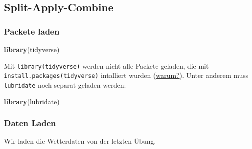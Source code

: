 \documentclass[]{book}
\newenvironment{Shaded}{\begin{snugshade}}{\end{snugshade}}
\newcommand{\DataTypeTok}[1]{\textcolor[rgb]{0.13,0.29,0.53}{#1}}
\newcommand{\KeywordTok}[1]{\textcolor[rgb]{0.13,0.29,0.53}{\textbf{#1}}}
\newcommand{\NormalTok}[1]{#1}
\newcommand{\OtherTok}[1]{\textcolor[rgb]{0.56,0.35,0.01}{#1}}
\newcommand{\StringTok}[1]{\textcolor[rgb]{0.31,0.60,0.02}{#1}}
\begin{document}
\hypertarget{split-apply-combine}{%
\subsection{Split-Apply-Combine}\label{split-apply-combine}}

\hypertarget{packete-laden}{%
\subsubsection{Packete laden}\label{packete-laden}}

\begin{Shaded}
\begin{Highlighting}[]
\KeywordTok{library}\NormalTok{(tidyverse)}
\end{Highlighting}
\end{Shaded}

Mit \texttt{library(tidyverse)} werden nicht alle Packete geladen, die mit \texttt{install.packages(tidyverse)} intalliert wurden (\href{https://community.rstudio.com/t/which-packages-get-loaded/298}{warum?}). Unter anderem muss \texttt{lubridate} noch separat geladen werden:

\begin{Shaded}
\begin{Highlighting}[]
\KeywordTok{library}\NormalTok{(lubridate) }
\end{Highlighting}
\end{Shaded}

\hypertarget{daten-laden}{%
\subsubsection{Daten Laden}\label{daten-laden}}

Wir laden die Wetterdaten von der letzten Übung.

\begin{Shaded}
\end{Shaded}
\end{document}
